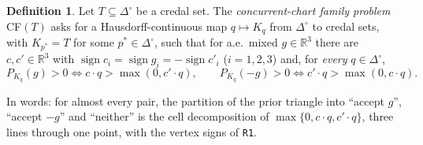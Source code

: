 \documentclass[11pt]{article}
\theoremstyle{definition}
\newtheorem{definition}[theorem]{Definition}
\theoremstyle{remark}
\newcommand{\R}{\mathbb R}
\newcommand{\Di}{\Delta^{\circ}}
\newcommand{\src}[1]{\texttt{#1}}
\begin{document}
\begin{definition}\label{def:CF}
Let $T\subseteq\Di$ be a credal set. The \emph{concurrent-chart family problem} CF$(T)$ asks for a Hausdorff-continuous map $q\mapsto K_q$ from $\Di$ to credal sets, with $K_{p^*}=T$ for some $p^*\in\Di$, such that for a.e.\ mixed $g\in\R^3$ there are $c,c'\in\R^3$ with $\operatorname{sign}c_i=\operatorname{sign}g_i=-\operatorname{sign}c'_i$ ($i=1,2,3$) and, for \emph{every} $q\in\Di$,
\[
P_{K_q}(g)>0\iff c\cdot q>\max(0,c'\cdot q),\qquad P_{K_q}(-g)>0\iff c'\cdot q>\max(0,c\cdot q).
\]
\end{definition}
In words: for almost every pair, the partition of the prior triangle into ``accept $g$'', ``accept $-g$'' and ``neither'' is the cell decomposition of $\max\{0,c\cdot q,c'\cdot q\}$, three lines through one point, with the vertex signs of \src{R1}.
\end{document}
